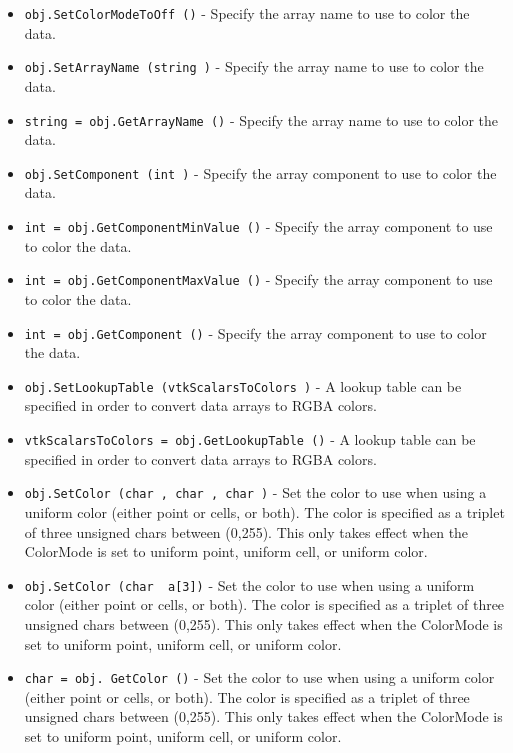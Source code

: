 \begin{itemize}
\item  \verb|obj.SetColorModeToOff ()| -  Specify the array name to use to color the data.

\item  \verb|obj.SetArrayName (string )| -  Specify the array name to use to color the data.

\item  \verb|string = obj.GetArrayName ()| -  Specify the array name to use to color the data.

\item  \verb|obj.SetComponent (int )| -  Specify the array component to use to color the data.

\item  \verb|int = obj.GetComponentMinValue ()| -  Specify the array component to use to color the data.

\item  \verb|int = obj.GetComponentMaxValue ()| -  Specify the array component to use to color the data.

\item  \verb|int = obj.GetComponent ()| -  Specify the array component to use to color the data.

\item  \verb|obj.SetLookupTable (vtkScalarsToColors )| -  A lookup table can be specified in order to convert data arrays to
 RGBA colors.

\item  \verb|vtkScalarsToColors = obj.GetLookupTable ()| -  A lookup table can be specified in order to convert data arrays to
 RGBA colors.

\item  \verb|obj.SetColor (char , char , char )| -  Set the color to use when using a uniform color (either point or cells,
 or both). The color is specified as a triplet of three unsigned chars
 between (0,255). This only takes effect when the ColorMode is set to
 uniform point, uniform cell, or uniform color.

\item  \verb|obj.SetColor (char  a[3])| -  Set the color to use when using a uniform color (either point or cells,
 or both). The color is specified as a triplet of three unsigned chars
 between (0,255). This only takes effect when the ColorMode is set to
 uniform point, uniform cell, or uniform color.

\item  \verb|char = obj. GetColor ()| -  Set the color to use when using a uniform color (either point or cells,
 or both). The color is specified as a triplet of three unsigned chars
 between (0,255). This only takes effect when the ColorMode is set to
 uniform point, uniform cell, or uniform color.

\end{itemize}
